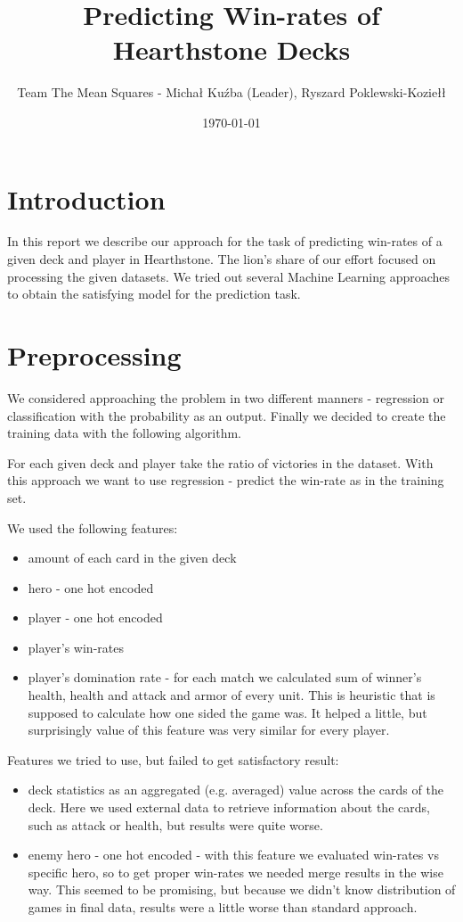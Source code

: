 \documentclass[a4paper]{article}
\title{Predicting Win-rates of Hearthstone Decks}
\author{Team The Mean Squares - Michał Kuźba (Leader), Ryszard Poklewski-Koziełł}
\date{\today}
\begin{document}
\maketitle

\section{Introduction}
\label{sec:introduction}
In this report we describe our approach for the task of predicting win-rates of a given deck and player in Hearthstone. 
The lion's share of our effort focused on processing the given datasets.
We tried out several Machine Learning approaches to obtain the satisfying model for the prediction task.

\section{Preprocessing}
We considered approaching the problem in two different manners - regression or classification with the probability as an output. 
Finally we decided to create the training data with the following algorithm.

For each given deck and player take the ratio of victories in the dataset.
With this approach we want to use regression - predict the win-rate as in the training set.

We used the following features:
\begin{itemize}
\item amount of each card in the given deck
\item hero - one hot encoded
\item player - one hot encoded
\item player's win-rates
\item player's domination rate - for each match we calculated sum of winner's health, health and attack and armor of every unit. This is heuristic that is supposed to calculate how one sided the game was. It helped a little, but surprisingly value of this feature was very similar for every player.
\end{itemize}

Features we tried to use, but failed to get satisfactory result:
\begin{itemize}
\item deck statistics as an aggregated (e.g. averaged) value across the cards of the deck. Here we used external data \cite{cards_api} to retrieve information about the cards, such as attack or health, but results were quite worse.
\item enemy hero - one hot encoded - with this feature we evaluated win-rates vs specific hero, so to get proper win-rates we needed merge results in the wise way. This seemed to be promising, but because we didn't know distribution of games in final data, results were a little worse than standard approach.


\end{itemize}
\end{document}
